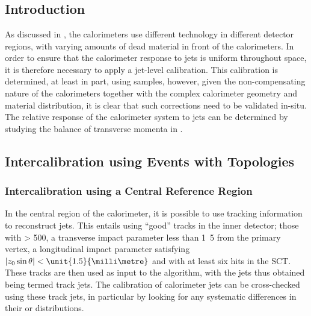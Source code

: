 \chapter{\etaint}
\label{chap:eta-intercalibration}


\section{Introduction}
As discussed in , the \ATLAS
calorimeters use different technology in different detector regions, with
varying amounts of dead material in front of the calorimeters. In order to
ensure that the calorimeter response to jets is uniform throughout \etaphi space,
it is therefore necessary to apply a jet-level calibration. This calibration is
determined, at least in part, using \MC samples, however, given the non-compensating nature of the calorimeters
together with the complex calorimeter geometry and material distribution, it is
clear that such corrections need to be validated in-situ. The relative response
of the calorimeter system to jets can be determined by studying the balance of transverse
momenta in . 

\section{Intercalibration using Events with \Dijet Topologies}
\subsection{Intercalibration using a Central Reference Region}
\label{sec:etaint:central_reference}
In the central region of the calorimeter, it is possible to use tracking information
to reconstruct jets. This entails using ``good'' tracks in the inner detector; those
with \pT > \unit{500}{\MeV}, a transverse impact parameter less than \unit{1.5}{\milli\metre}
from the primary vertex, a longitudinal impact parameter satisfying $|z_0 \sin{\theta}| < \unit{1.5}{\milli\metre}$
and with at least six hits in the SCT. These tracks are then used as input to the
\akt algorithm, with the jets thus obtained being termed track jets. The calibration
of calorimeter jets can be cross-checked using these track jets, in particular by looking for
any systematic differences in their \pT or \pseudorap distributions.


